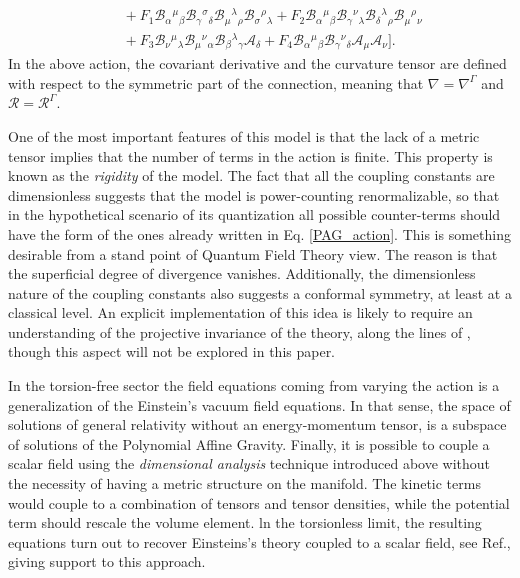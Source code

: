 \begin{equation}
\begin{split}
    \\
    & \quad
    + F_1 \mathcal{B}_{\alpha}{}^{\mu}{}_{\beta} \mathcal{B}_{\gamma}{}^{\sigma}{}_{\delta} \mathcal{B}_{\mu}{}^{\lambda}{}_{\rho} \mathcal{B}_{\sigma}{}^{\rho}{}_{\lambda}
    + F_2\mathcal{B}_{\alpha}{}^{\mu}{}_{\beta} \mathcal{B}_{\gamma}{}^{\nu}{}_{\lambda} \mathcal{B}_{\delta}{}^{\lambda}{}_{\rho} \mathcal{B}_{\mu}{}^{\rho}{}_{\nu}
    \\
    &\quad
    + F_3 \mathcal{B}_{\nu}{}^{\mu}{}_{\lambda} \mathcal{B}_{\mu}{}^{\nu}{}_{\alpha} \mathcal{B}_{\beta}{}^{\lambda}{}_{\gamma} \mathcal{A}_\delta
    + F_4 \mathcal{B}_{\alpha}{}^{\mu}{}_{\beta}\mathcal{B}_{\gamma}{}^{\nu}{}_{\delta}\mathcal{A}_\mu \mathcal{A}_\nu \bigg].
    \end{split}
\end{equation}
In the above action, the covariant derivative and the curvature tensor are defined
with respect to the symmetric part of the connection, meaning that $\nabla = \nabla^{\Gamma}$ 
and $\mathcal{R} = \mathcal{R}^{\Gamma}$. 

One of the most important features of this model is that the lack of a metric tensor  implies that the number of terms in the action is finite. This property is known as the \textit{rigidity} of the model.
The fact that all the coupling constants are dimensionless  suggests that the model is power-counting renormalizable, so that in the hypothetical scenario of its quantization all possible counter-terms should have the form of the ones already written in Eq. \eqref{PAG_action}.  This is something desirable from a stand point of Quantum Field Theory view. The reason is that the superficial degree of divergence vanishes. Additionally, the dimensionless nature of the coupling constants also suggests a conformal symmetry, at least at a classical level. An explicit implementation of this idea is likely to require an understanding of the projective invariance of the theory, along the lines of \cite{Olmo:2022ops}, though this aspect will not be explored in this paper. 

In the torsion-free sector the field equations coming from varying the action is a generalization
of the Einstein's vacuum field equations. In that sense, the space of solutions of general relativity
without an energy-momentum tensor, is a subspace of solutions of the Polynomial Affine Gravity.
Finally, it is possible to couple a scalar field using the \textit{dimensional analysis} technique introduced above without the necessity of having a metric structure on the manifold. The kinetic terms would couple to a combination of tensors and tensor densities, while the potential term should rescale the volume element. ln the torsionless limit, the resulting equations turn out to recover Einsteins's theory coupled to a scalar field, see Ref.\cite{castillofelisola2023inflationary}, giving support to this approach.

